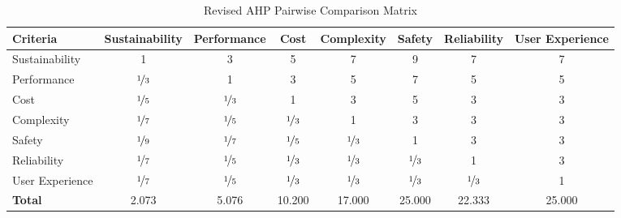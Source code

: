 \documentclass[12pt]{article}
\begin{document}
\begin{landscape}
\begin{table}[h!]
\centering
\caption{Revised AHP Pairwise Comparison Matrix}
\label{tab:revised_ahp_matrix}
\begin{tabular}{l c c c c c c c}
\toprule
\textbf{Criteria} & \textbf{Sustainability} & \textbf{Performance} & \textbf{Cost} & \textbf{Complexity} & \textbf{Safety} & \textbf{Reliability} & \textbf{User Experience} \\
\midrule
Sustainability & 1 & 3 & 5 & 7 & 9 & 7 & 7 \\
Performance & $\nicefrac{1}{3}$ & 1 & 3 & 5 & 7 & 5 & 5 \\
Cost & $\nicefrac{1}{5}$ & $\nicefrac{1}{3}$ & 1 & 3 & 5 & 3 & 3 \\
Complexity & $\nicefrac{1}{7}$ & $\nicefrac{1}{5}$ & $\nicefrac{1}{3}$ & 1 & 3 & 3 & 3 \\
Safety & $\nicefrac{1}{9}$ & $\nicefrac{1}{7}$ & $\nicefrac{1}{5}$ & $\nicefrac{1}{3}$ & 1 & 3 & 3 \\
Reliability & $\nicefrac{1}{7}$ & $\nicefrac{1}{5}$ & $\nicefrac{1}{3}$ & $\nicefrac{1}{3}$ & $\nicefrac{1}{3}$ & 1 & 3 \\
User Experience & $\nicefrac{1}{7}$ & $\nicefrac{1}{5}$ & $\nicefrac{1}{3}$ & $\nicefrac{1}{3}$ & $\nicefrac{1}{3}$ & $\nicefrac{1}{3}$ & 1 \\
\midrule
\textbf{Total} & 2.073 & 5.076 & 10.200 & 17.000 & 25.000 & 22.333 & 25.000 \\
\bottomrule
\end{tabular}
\end{table}


\end{landscape}
\end{document}
